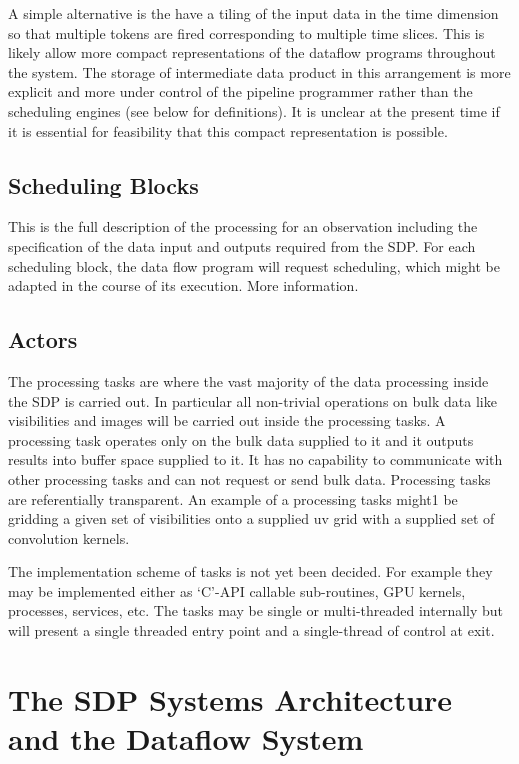 \documentclass[11pt,a4paper]{article}
\begin{document}
A simple alternative is the have a tiling of the input data in the
time dimension so that multiple tokens are fired corresponding to
multiple time slices. This is likely allow more compact
representations of the dataflow programs throughout the system. The
storage of intermediate data product in this arrangement is more
explicit and more under control of the pipeline programmer rather than
the scheduling engines (see below for definitions). It is unclear at
the present time if it is essential for feasibility that this compact
representation is possible.


\subsection{Scheduling Blocks}

This is the full description of the processing for an observation
including the specification of the data input and outputs required
from the SDP.  For each scheduling block, the data flow program will
request scheduling, which might be adapted in the course of its
execution. More information.

\subsection{Actors}
The processing tasks are where the vast majority of the data
processing inside the SDP is carried out. In particular all
non-trivial operations on bulk data like visibilities and images will
be carried out inside the processing tasks. A processing task operates
only on the bulk data supplied to it and it outputs results into
buffer space supplied to it. It has no capability to communicate with
other processing tasks and can not request or send bulk
data. Processing tasks are referentially transparent. An example of a
processing tasks might1 be gridding a given set of visibilities onto a
supplied uv grid with a supplied set of convolution kernels.

The implementation scheme of tasks is not yet been decided. For
example they may be implemented either as ‘C’-API callable
sub-routines, GPU kernels, processes, services, etc. The tasks may be
single or multi-threaded internally but will present a single threaded
entry point and a single-thread of control at exit.


\section{The SDP Systems Architecture and the Dataflow System}
\label{sec:sdp-syst-arch}
\end{document}
